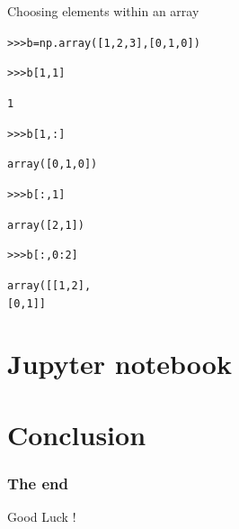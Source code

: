 \documentclass[xcolor=pdftex,dvipsnames,table,mathserif]{beamer}
\begin{document}
\begin{frame}{Choosing elements within an array}

  \begin{block}{}
    \begin{alltt}
      >>> b = np.array([1, 2, 3], [0, 1, 0])

      >>> b[1,1]

      1

      >>> b[1,:]

      array([0, 1, 0])

      >>> b[:,1]

      array([2, 1])

      >>> b[:,0:2]

      array([[1, 2],
        [0, 1]]

    \end{alltt}
  \end{block}


\end{frame}


\section{Jupyter notebook}







\section{Conclusion}


\begin{frame}
  \frametitle{The end}

  \vspace{3ex}

  \centering
  \Large Good Luck !

\end{frame}
\end{document}
